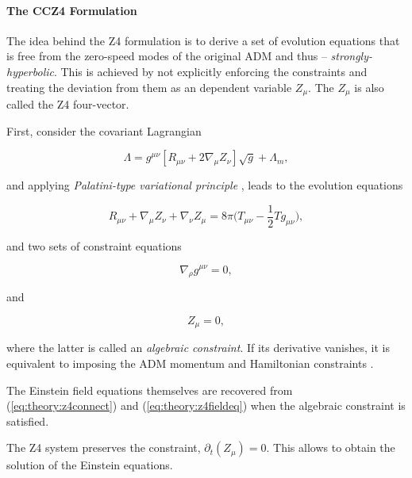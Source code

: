 {    
    \paragraph{The CCZ4 Formulation}
    
    
    The idea behind the Z4 formulation is to derive a set of evolution equations that is free from the zero-speed modes of the original ADM and thus -- \textit{strongly-hyperbolic}. 
    This is achieved by not explicitly enforcing the constraints and treating the deviation from them as an dependent variable $Z_{\mu}$. The $Z_{\mu}$ is also called the Z4 four-vector.
    
    First, consider the covariant Lagrangian
    
    \begin{equation}
        \Lambda = g^{\mu\nu}[R_{\mu\nu} + 2\nabla_{\mu}Z_{\nu}]\sqrt{g} + \Lambda_m,
    \end{equation}
    
    and applying \textit{Palatini-type variational principle} \cite{Bona:2010is}, leads to the evolution equations
    
    \begin{equation}
        R_{\mu\nu} + \nabla_{\mu}Z_{\nu} + \nabla_{\nu}Z_{\mu}=8\pi\Big(T_{\mu\nu} - \frac{1}{2}Tg_{\mu\nu}\Big),
    \label{eq:theory:z4fieldeq}
    \end{equation}
    
    and two sets of constraint equations
    
    \begin{equation}
        \nabla_{\rho} g^{\mu\nu} = 0, 
    \label{eq:theory:z4connect}
    \end{equation}
    
    and
    
    \begin{equation}
        Z_{\mu} = 0,
    \end{equation}
    
    where the latter is called an \textit{algebraic constraint}. 
    If its derivative vanishes, it is equivalent to imposing the ADM momentum and Hamiltonian constraints \cite{Bona:2009}. 
    
    The Einstein field equations themselves are recovered from (\ref{eq:theory:z4connect}) and (\ref{eq:theory:z4fieldeq}) when the algebraic constraint is satisfied. 
    
    The Z4 system preserves the constraint, $\partial_t (Z_{\mu})= 0$. 
    This allows to obtain the solution of the Einstein equations. 
    
}
